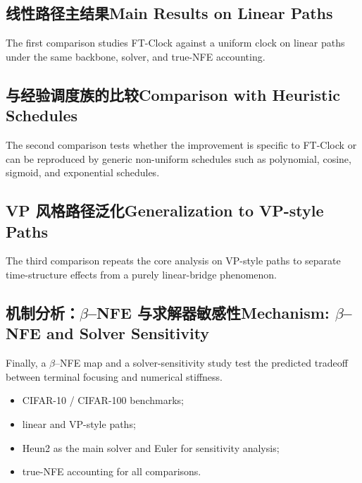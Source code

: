 \subsection{\ifinternalcn 线性路径主结果\else Main Results on Linear Paths\fi}
The first comparison studies FT-Clock against a uniform clock on linear paths under the same backbone, solver, and true-NFE accounting.

\subsection{\ifinternalcn 与经验调度族的比较\else Comparison with Heuristic Schedules\fi}
The second comparison tests whether the improvement is specific to FT-Clock or can be reproduced by generic non-uniform schedules such as polynomial, cosine, sigmoid, and exponential schedules.

\subsection{\ifinternalcn VP 风格路径泛化\else Generalization to VP-style Paths\fi}
The third comparison repeats the core analysis on VP-style paths to separate time-structure effects from a purely linear-bridge phenomenon.

\subsection{\ifinternalcn 机制分析：$\beta$--NFE 与求解器敏感性\else Mechanism: \texorpdfstring{$\beta$--NFE}{beta-NFE} and Solver Sensitivity\fi}
Finally, a $\beta$--NFE map and a solver-sensitivity study test the predicted tradeoff between terminal focusing and numerical stiffness.
\begin{itemize}[leftmargin=1.5em]
  \item CIFAR-10 / CIFAR-100 benchmarks;
  \item linear and VP-style paths;
  \item Heun2 as the main solver and Euler for sensitivity analysis;
  \item true-NFE accounting for all comparisons.
\end{itemize}
\fi
